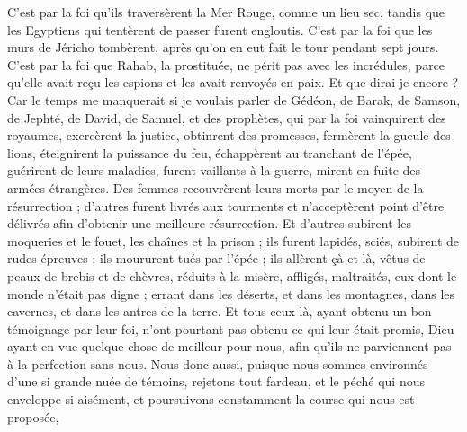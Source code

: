 \begin{multicols}{2}
C’est par la foi qu’ils traversèrent la Mer Rouge, comme un lieu sec, tandis que les Egyptiens qui tentèrent de passer furent engloutis.
C’est par la foi que les murs de Jéricho tombèrent, après qu'on en eut fait le tour pendant sept jours.
C’est par la foi que Rahab, la prostituée, ne périt pas avec les incrédules, parce qu’elle avait reçu les espions et les avait renvoyés en paix.
Et que dirai-je encore ? Car le temps me manquerait si je voulais parler de Gédéon, de Barak, de Samson, de Jephté, de David, de Samuel, et des prophètes,
qui par la foi vainquirent des royaumes, exercèrent la justice, obtinrent des promesses, fermèrent la gueule des lions,
éteignirent la puissance du feu, échappèrent au tranchant de l’épée, guérirent de leurs maladies, furent vaillants à la guerre, mirent en fuite des armées étrangères.
Des femmes recouvrèrent leurs morts par le moyen de la résurrection ; d'autres furent livrés aux tourments et n’acceptèrent point d'être délivrés afin d'obtenir une meilleure résurrection.
Et d'autres subirent les moqueries et le fouet, les chaînes et la prison ;
ils furent lapidés, sciés, subirent de rudes épreuves ; ils moururent tués par l'épée ; ils allèrent çà et là, vêtus de peaux de brebis et de chèvres, réduits à la misère, affligés, maltraités,
eux dont le monde n'était pas digne ; errant dans les déserts, et dans les montagnes, dans les cavernes, et dans les antres de la terre.
Et tous ceux-là, ayant obtenu un bon témoignage par leur foi, n'ont pourtant pas obtenu ce qui leur était promis,
Dieu ayant en vue quelque chose de meilleur pour nous, afin qu'ils ne parviennent pas à la perfection sans nous.
\VerseOne{}Nous donc aussi, puisque nous sommes environnés d'une si grande nuée de témoins, rejetons tout fardeau, et le péché qui nous enveloppe si aisément, et poursuivons constamment la course qui nous est proposée,

\end{multicols}
